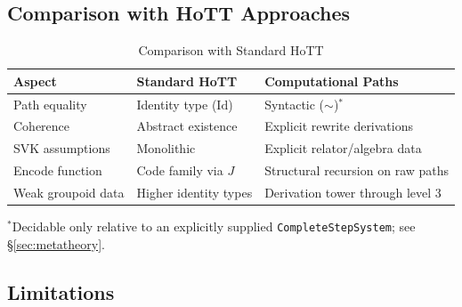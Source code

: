 \documentclass{lmcs}
\theoremstyle{definition}
\theoremstyle{plain}
\theoremstyle{remark}
\newcommand{\Id}{\mathrm{Id}}
\newcommand{\RwEq}{\sim}
\begin{document}
\subsection{Comparison with HoTT Approaches}

\leavevmode
\begin{table}[H]
\centering
\caption{Comparison with Standard HoTT}
\label{tab:hott-comparison}
\begin{tabular}{@{}lll@{}}
\toprule
\textbf{Aspect} & \textbf{Standard HoTT} & \textbf{Computational Paths} \\
\midrule
Path equality & Identity type ($\Id$) & Syntactic ($\RwEq$)$^*$ \\
Coherence & Abstract existence & Explicit rewrite derivations \\
SVK assumptions & Monolithic & Explicit relator/algebra data \\
Encode function & Code family via $J$ & Structural recursion on raw paths \\
Weak groupoid data & Higher identity types & Derivation tower through level 3 \\
\bottomrule
\end{tabular}

\smallskip
\noindent $^*$Decidable only relative to an explicitly supplied
\texttt{CompleteStepSystem}; see \S\ref{sec:metatheory}.
\end{table}

\subsection{Limitations}
\end{document}
